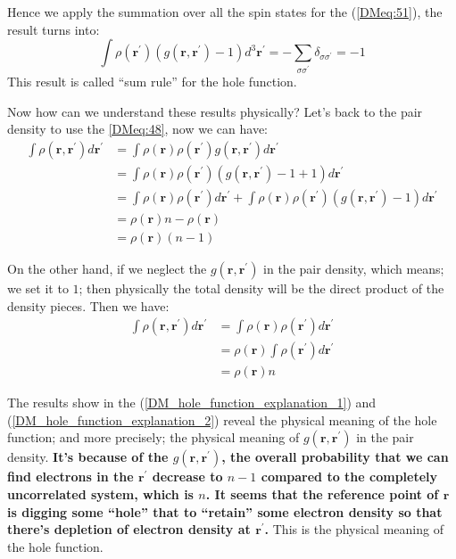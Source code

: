 Hence we apply the summation over all the spin states for the
(\ref{DMeq:51}), the result turns into:
\begin{equation}\label{DMeq:55}
  \int\rho(\bm{r^{'}})
  (g(\bm{r}, \bm{r^{'}}) - 1)d^{3}\bm{r^{'}} =
- \sum_{\sigma\sigma^{'}}\delta_{\sigma\sigma^{'}} = -1
\end{equation}
This result is called ``sum rule'' for the hole function.

Now how can we understand these results physically? Let's
back to the pair density to use the 
\ref{DMeq:48}, now we can have:
\begin{equation}
 \begin{split}
 \int \rho(\bm{r}, \bm{r^{'}}) d \bm{r^{'}}
&= \int \rho(\bm{r})\rho(\bm{r^{'}})
  g(\bm{r}, \bm{r^{'}}) d \bm{r^{'}} \\
&= \int \rho(\bm{r})\rho(\bm{r^{'}})
  (g(\bm{r}, \bm{r^{'}}) - 1 + 1) d \bm{r^{'}} \\
&=\int \rho(\bm{r})\rho(\bm{r^{'}})d \bm{r^{'}} +
\int \rho(\bm{r})\rho(\bm{r^{'}})
  (g(\bm{r}, \bm{r^{'}}) - 1) d \bm{r^{'}} \\
&= \rho(\bm{r})n-\rho(\bm{r}) \\
&= \rho(\bm{r})(n-1)
 \end{split}
 \label{DM_hole_function_explanation_1}
\end{equation}

On the other hand, if we neglect the $g(\bm{r}, \bm{r^{'}})$ in the pair
density, which means; we set it to $1$; then physically the total density will
be the direct product of the density pieces. Then we have:
\begin{equation}
\begin{split}
  \int \rho(\bm{r}, \bm{r^{'}}) d \bm{r^{'}}
&= \int \rho(\bm{r})\rho(\bm{r^{'}}) d \bm{r^{'}} \\
&=\rho(\bm{r})\int \rho(\bm{r^{'}}) d \bm{r^{'}} \\
&= \rho(\bm{r})n
\end{split}
\label{DM_hole_function_explanation_2}
\end{equation}

The results show in the (\ref{DM_hole_function_explanation_1}) and
(\ref{DM_hole_function_explanation_2}) reveal the physical meaning of the hole
function; and more precisely; the physical meaning of $g(\bm{r}, \bm{r^{'}})$
in the pair density. \textbf{It's because of the $g(\bm{r}, \bm{r^{'}})$, the
overall probability that we can find electrons in the $\bm{r^{'}}$ decrease to
$n-1$ compared to the completely uncorrelated system, which is $n$. It seems
that the reference point of $\bm{r}$ is digging some ``hole'' that to
``retain'' some electron density so that there's depletion of electron
density at $\bm{r^{'}}$.} This is the physical meaning of the hole function.

